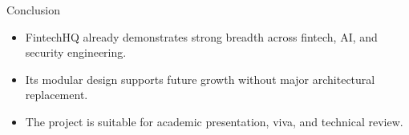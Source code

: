 \documentclass{beamer}
\begin{document}
\begin{frame}{Conclusion}
\begin{itemize}
\item FintechHQ already demonstrates strong breadth across fintech, AI, and security engineering.
\item Its modular design supports future growth without major architectural replacement.
\item The project is suitable for academic presentation, viva, and technical review.
\end{itemize}
\end{frame}
\end{document}
